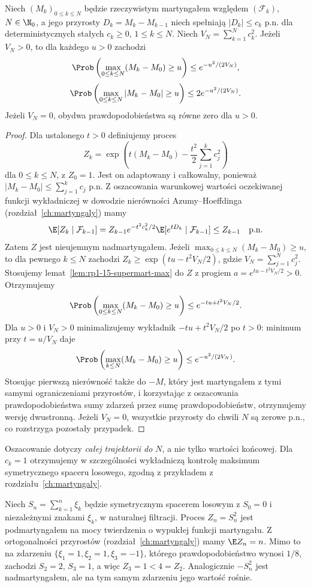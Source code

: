 \begin{twierdzenie}
\label{thm:rp1-15-max-azuma}
Niech $(M_k)_{0\leq k\leq N}$ będzie rzeczywistym
martyngałem względem $(\mathcal F_k)$, $N\in\N_0$,
a jego przyrosty $D_k=M_k-M_{k-1}$ niech
spełniają $|D_k|\leq c_k$ p.n. dla deterministycznych
stałych $c_k\geq0$, $1\leq k\leq N$.
Niech $V_N=\sum_{k=1}^Nc_k^2$.
Jeżeli $V_N>0$, to dla każdego $u>0$ zachodzi
\[
\Prob\left(\max_{0\leq k\leq N}(M_k-M_0)\geq u\right)
\leq e^{-u^2/(2V_N)},
\]
\[
\Prob\left(\max_{0\leq k\leq N}|M_k-M_0|\geq u\right)
\leq 2e^{-u^2/(2V_N)}.
\]
Jeżeli $V_N=0$, obydwa prawdopodobieństwa
są równe zero dla $u>0$.
\end{twierdzenie}
\begin{proof}
Dla ustalonego $t>0$ definiujemy proces
\[
Z_k=\exp\left(t(M_k-M_0)-\frac{t^2}{2}
\sum_{j=1}^k c_j^2\right)
\]
dla $0\leq k\leq N$, z $Z_0=1$.
Jest on adaptowany i całkowalny, ponieważ
$|M_k-M_0|\leq\sum_{j=1}^kc_j$ p.n.
Z oszacowania warunkowej wartości oczekiwanej
funkcji wykładniczej w dowodzie nierówności
Azumy--Hoeffdinga (rozdział~\ref{ch:martyngaly}) mamy
\[
\E[Z_k\mid\mathcal F_{k-1}]
=Z_{k-1}e^{-t^2c_k^2/2}
 \E[e^{tD_k}\mid\mathcal F_{k-1}]
\leq Z_{k-1}\quad\text{p.n.}
\]
Zatem $Z$ jest nieujemnym nadmartyngałem.
Jeżeli $\max_{0\leq k\leq N}(M_k-M_0)\geq u$, to dla
pewnego $k\leq N$ zachodzi
$Z_k\geq\exp(tu-t^2V_N/2)$, gdzie
$V_N=\sum_{j=1}^N c_j^2$.
Stosujemy lemat~\ref{lem:rp1-15-supermart-max}
do $Z$ z progiem $a=e^{tu-t^2V_N/2}>0$.
Otrzymujemy
\[
\Prob\left(\max_{0\leq k\leq N}(M_k-M_0)\geq u\right)
\leq e^{-tu+t^2V_N/2}.
\]
Dla $u>0$ i $V_N>0$ minimalizujemy wykładnik
$-tu+t^2V_N/2$ po $t>0$: minimum przy $t=u/V_N$ daje
\[
\Prob\left(\max_{k\leq N}(M_k-M_0)\geq u\right)
\leq e^{-u^2/(2V_N)}.
\]
Stosując pierwszą nierówność także do $-M$,
który jest martyngałem z tymi samymi ograniczeniami
przyrostów, i korzystając z oszacowania
prawdopodobieństwa sumy zdarzeń przez sumę
prawdopodobieństw, otrzymujemy wersję dwustronną.
Jeżeli $V_N=0$, wszystkie przyrosty do chwili $N$
są zerowe p.n., co rozstrzyga pozostały przypadek.
\end{proof}

Oszacowanie dotyczy \emph{całej trajektorii do $N$},
a nie tylko wartości końcowej. Dla $c_k=1$
otrzymujemy w szczególności wykładniczą kontrolę
maksimum symetrycznego spaceru losowego,
zgodną z przykładem z rozdziału~\ref{ch:martyngaly}.

\begin{przyklad}
Niech $S_n=\sum_{k=1}^n\xi_k$ będzie symetrycznym
spacerem losowym z $S_0=0$ i niezależnymi znakami
$\xi_k$, w naturalnej filtracji.
Proces $Z_n=S_n^2$ jest podmartyngałem na mocy
twierdzenia o wypukłej funkcji martyngału.
Z ortogonalności przyrostów
(rozdział~\ref{ch:martyngaly}) mamy $\E Z_n=n$.
Mimo to na zdarzeniu
$\{\xi_1=1,\xi_2=1,\xi_3=-1\}$, którego
prawdopodobieństwo wynosi $1/8$, zachodzi
$S_2=2$, $S_3=1$, a więc $Z_3=1<4=Z_2$.
Analogicznie $-S_n^2$ jest nadmartyngałem,
ale na tym samym zdarzeniu jego wartość rośnie.
\end{przyklad}

